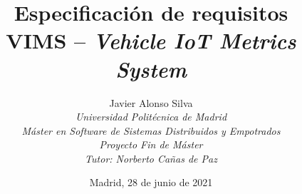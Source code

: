 \def\University{\textit{Universidad Politécnica de Madrid}}
\def\Course{\textit{Máster en Software de Sistemas Distribuidos y Empotrados}}
\def\Module{\textit{Proyecto Fin de Máster}}
\def\Docent{\textit{Tutor: Norberto Cañas de Paz}}

\def\BoldTitle{Especificación de requisitos}
\def\Subtitle{VIMS -- \textit{Vehicle IoT Metrics System}}
\def\Authors{Javier Alonso Silva}
\def\Shortname{J. Alonso}

\title{\textbf{\BoldTitle}\\\Subtitle}
\author{\Authors \\\University\\\Course\\\Module\\\Docent}
\date{Madrid, 28 de junio de 2021}